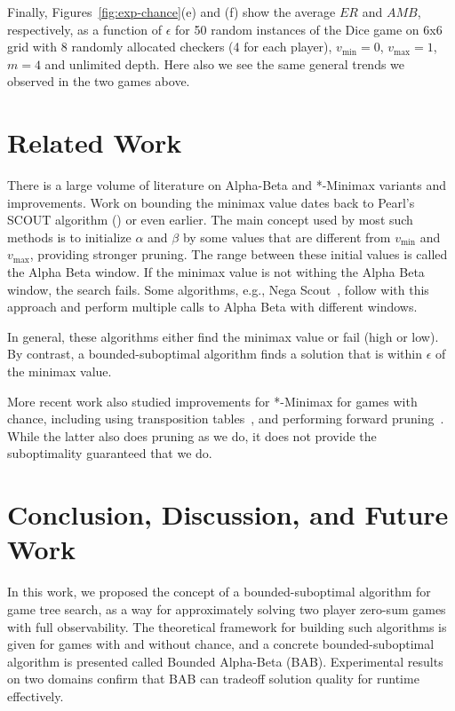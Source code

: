 \documentclass[runningheads]{llncs}
\newcommand{\vmax}{v_{\text{max}}}
\newcommand{\vmin}{v_{\text{min}}}
\newcommand{\amb}{\mathit{AMB}}
\newcommand{\er}{\mathit{ER}}
\begin{document}
Finally, Figures~\ref{fig:exp-chance}(e) and (f) show the average $\er$ and $\amb$, respectively, as a function of $\epsilon$ for 50 random instances of the Dice game on 6x6 grid with 8 randomly allocated checkers (4 for each player), $\vmin=0$, $\vmax=1$, $m=4$ and unlimited depth. Here also we see the same general trends we observed in the two games above. 

\section{Related Work}

There is a large volume of literature on Alpha-Beta and *-Minimax variants and improvements. 
Work on bounding the minimax value dates back to Pearl's SCOUT algorithm (\citeyear{pearl1980scout}) or even earlier. The main concept used by most such methods is to initialize $\alpha$ and $\beta$ by some values that are different from $\vmin$ and $\vmax$, providing stronger pruning. 
The range between these initial values is called the Alpha Beta window. If the minimax value is not withing the Alpha Beta window, the search fails. Some algorithms, e.g., Nega Scout~\citep{reinefeld1983improvement}, follow with this approach and perform multiple calls to Alpha Beta with different windows. 

In general, these algorithms either find the minimax value or fail (high or low). By contrast, a bounded-suboptimal algorithm finds a solution that is within $\epsilon$ of the minimax value. %

More recent work also studied improvements for *-Minimax for games with chance, including using transposition tables~\citep{veness2007effective}, and performing forward pruning~\citep{schadd2009chanceprobcut}. While the latter also does pruning as we do, it does not provide the suboptimality guaranteed that we do. 

\section{Conclusion, Discussion, and Future Work}
In this work, we proposed the concept of a bounded-suboptimal algorithm for game tree search, as a way for approximately solving two player zero-sum games with full observability. The theoretical framework for building such algorithms is given for games with and without chance, and a concrete bounded-suboptimal algorithm is presented called Bounded Alpha-Beta (BAB). Experimental results on two domains confirm that BAB can tradeoff solution quality for runtime effectively. 
\end{document}
